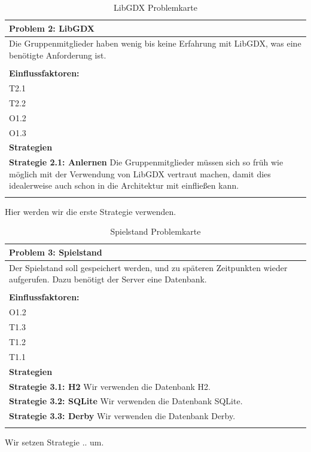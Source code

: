 \documentclass[fontsize=12pt,paper=a4,twoside]{scrartcl}
\begin{document}
\begin{table}[H]
    \centering
    \begin{tabular}{|p{15cm}|}
    \hline
          \textbf{Problem 2:} LibGDX \\ \hline
	Die Gruppenmitglieder haben wenig bis keine Erfahrung mit LibGDX, was eine benötigte Anforderung ist. \\
         \\ \hline
          \textbf{Einflussfaktoren: } \\
	T2.1 \\
	T2.2 \\
	O1.2 \\
	O1.3 \\
          \hline
          \textbf{Strategien} \\ \hline
            {}          
           \label{strategie:2.1}     
          \textbf{Strategie 2.1: Anlernen} Die Gruppenmitglieder müssen sich so früh wie möglich mit der Verwendung von LibGDX vertraut machen, damit dies idealerweise auch schon in die Architektur mit einfließen kann.  \\        
	 \\ \hline
    \end{tabular}

    \caption{LibGDX Problemkarte}
    \label{tab:ProblemKarte2}
\end{table}
Hier werden wir die erste Strategie verwenden. \\

\begin{table}[H]
    \centering
    \begin{tabular}{|p{15cm}|}
    \hline
          \textbf{Problem 3: Spielstand}  \\ \hline
	Der Spielstand soll gespeichert werden, und zu späteren Zeitpunkten wieder aufgerufen. Dazu benötigt der Server eine Datenbank. \\
         \\ \hline
          \textbf{Einflussfaktoren: } \\
	O1.2 \\
	T1.3 \\
	T1.2 \\
	T1.1 \\
          \hline
          \textbf{Strategien} \\ \hline
            {}          
           \label{strategie:3.1}     
          \textbf{Strategie 3.1: H2}  Wir verwenden die Datenbank H2. \\        
  {}          
           \label{strategie:3.2}              
          \textbf{Strategie 3.2: SQLite} Wir verwenden die Datenbank SQLite. \\
	 {}          
           \label{strategie:3.3}     
          \textbf{Strategie 3.3: Derby } Wir verwenden die Datenbank Derby. \\ 
	 \\ \hline
    \end{tabular}

    \caption{Spielstand Problemkarte}
    \label{tab:ProblemKarte3}
\end{table}
Wir setzen Strategie .. um. \\
\end{document}
